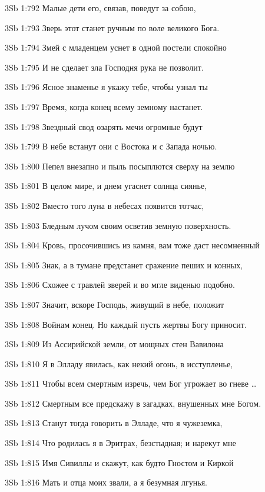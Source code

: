 \vs 3Sb 1:792 Малые дети его, связав, поведут за собою, 

\vs 3Sb 1:793 Зверь этот станет ручным по воле великого Бога. 

\vs 3Sb 1:794 Змей с младенцем уснет в одной постели спокойно

\vs 3Sb 1:795 И не сделает зла  Господня рука не позволит.

\vs 3Sb 1:796 Ясное знаменье я укажу тебе, чтобы узнал ты

\vs 3Sb 1:797 Время, когда конец всему земному настанет.

\vs 3Sb 1:798 Звездный свод озарять мечи огромные будут 

\vs 3Sb 1:799 В небе встанут они с Востока и с Запада ночью.

\vs 3Sb 1:800 Пепел внезапно и пыль посыплются сверху на землю 

\vs 3Sb 1:801 В целом мире, и днем угаснет солнца сиянье, 

\vs 3Sb 1:802 Вместо того луна в небесах появится тотчас, 

\vs 3Sb 1:803 Бледным лучом своим осветив земную поверхность. 

\vs 3Sb 1:804 Кровь, просочившись из камня, вам тоже даст несомненный

\vs 3Sb 1:805 Знак, а в тумане предстанет сражение пеших и конных, 

\vs 3Sb 1:806 Схожее с травлей зверей и во мгле виденью подобно. 

\vs 3Sb 1:807 Значит, вскоре Господь, живущий в небе, положит 

\vs 3Sb 1:808 Войнам конец. Но каждый пусть жертвы Богу приносит.

\vs 3Sb 1:809 Из Ассирийской земли, от мощных стен Вавилона 

\vs 3Sb 1:810 Я в Элладу явилась, как некий огонь, в исступленье,

\vs 3Sb 1:811 Чтобы всем смертным изречь, чем Бог угрожает во гневе \ldots\

\vs 3Sb 1:812 Смертным все предскажу в загадках, внушенных мне Богом.

\vs 3Sb 1:813 Станут тогда говорить в Элладе, что я  чужеземка, 

\vs 3Sb 1:814 Что родилась я в Эритрах, безстыдная; и нарекут мне

\vs 3Sb 1:815 Имя Сивиллы и скажут, как будто Гностом и Киркой 

\vs 3Sb 1:816 Мать и отца моих звали, а я  безумная лгунья. 

